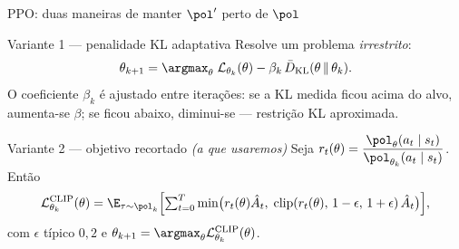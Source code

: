 \documentclass[aspectratio=169, 10pt]{beamer}
\newcommand{\thv}{\theta}
\newcommand{\thk}{\thv_k}
\newcommand{\polth}{\pol_{\thv}}
\newcommand{\polnovo}{\pol'}
\newcommand{\traj}{\tau}
\newcommand{\Ahat}{\hat{A}}
\newcommand{\Lsub}[1]{\mathcal{L}_{#1}}
\DeclareMathOperator{\clip}{clip}
\newcommand{\razao}{r_t(\thv)}
\newcommand{\Lclip}{\mathcal{L}^{\mathrm{CLIP}}}
\begin{document}
\begin{frame}{PPO: duas maneiras de manter $\polnovo$ perto de $\pol$}

  \begin{teobox}{Variante 1 --- penalidade KL adaptativa}
    Resolve um problema \emph{irrestrito}:
    \[
      \thv_{k+1} = \argmax_{\thv}\; \Lsub{\thk}(\thv)
        - \beta_k\, \bar{D}_{\mathrm{KL}}(\thv \,\|\, \thk).
    \]
    O coeficiente $\beta_k$ é ajustado entre iterações: se a KL medida ficou acima do
    alvo, aumenta-se $\beta$; se ficou abaixo, diminui-se --- restrição KL aproximada.
  \end{teobox}

  \vspace{-0.4em}
  \begin{teobox}{Variante 2 --- objetivo recortado \emph{(a que usaremos)}}
    Seja $\razao = \dfrac{\polth(a_t\mid s_t)}{\pol_{\thk}(a_t\mid s_t)}$. Então
    \[
      \Lclip_{\thk}(\thv) = \E_{\traj\sim\pol_k}
        \Bigl[\textstyle\sum_{t=0}^{T}
          \min\bigl(\razao \Ahat_t,\;
          \clip(\razao,\,1-\epsilon,\,1+\epsilon)\,\Ahat_t\bigr)\Bigr],
    \]
    com $\epsilon$ típico $0{,}2$ e $\thv_{k+1} = \argmax_{\thv}\Lclip_{\thk}(\thv)$.
  \end{teobox}
\end{frame}
\end{document}
